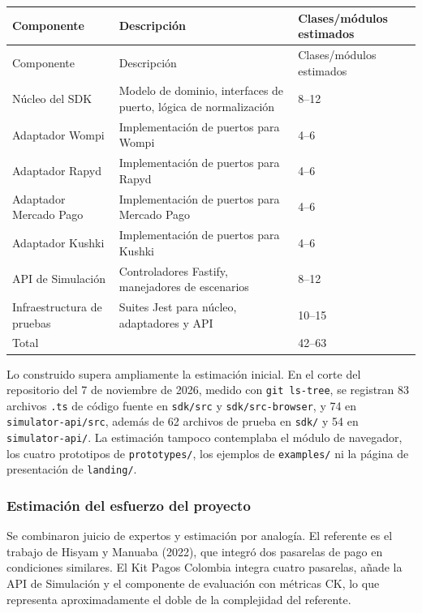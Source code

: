 \begin{center}
\renewcommand{\arraystretch}{1.2}
\SinNumero
\begin{longtable}{|P{0.243}|P{0.514}|P{0.243}|}
  \hline
  Componente & Descripción & Clases/módulos estimados \\
  \hline
  \endfirsthead
  \hline
  Componente & Descripción & Clases/módulos estimados \\
  \hline
  \endhead
  Núcleo del SDK & Modelo de dominio, interfaces de puerto, lógica de normalización & 8–12 \\
  \hline
  Adaptador Wompi & Implementación de puertos para Wompi & 4–6 \\
  \hline
  Adaptador Rapyd & Implementación de puertos para Rapyd & 4–6 \\
  \hline
  Adaptador Mercado Pago & Implementación de puertos para Mercado Pago & 4–6 \\
  \hline
  Adaptador Kushki & Implementación de puertos para Kushki & 4–6 \\
  \hline
  API de Simulación & Controladores Fastify, manejadores de escenarios & 8–12 \\
  \hline
  Infraestructura de pruebas & Suites Jest para núcleo, adaptadores y API & 10–15 \\
  \hline
  Total &  & 42–63 \\
  \hline
\end{longtable}
\end{center}

Lo construido supera ampliamente la estimación inicial. En el corte del repositorio del 7 de noviembre de 2026, medido con \texttt{git ls-tree}, se registran 83 archivos \texttt{.ts} de código fuente en \texttt{sdk/src} y \texttt{sdk/src-browser}, y 74 en \texttt{simulator-api/src}, además de 62 archivos de prueba en \texttt{sdk/} y 54 en \texttt{simulator-api/}. La estimación tampoco contemplaba el módulo de navegador, los cuatro prototipos de \texttt{prototypes/}, los ejemplos de \texttt{examples/} ni la página de presentación de \texttt{landing/}.

\subsubsection{Estimación del esfuerzo del proyecto}

Se combinaron juicio de expertos y estimación por analogía. El referente es el trabajo de Hisyam y Manuaba (2022), que integró dos pasarelas de pago en condiciones similares. El Kit Pagos Colombia integra cuatro pasarelas, añade la API de Simulación y el componente de evaluación con métricas CK, lo que representa aproximadamente el doble de la complejidad del referente.

